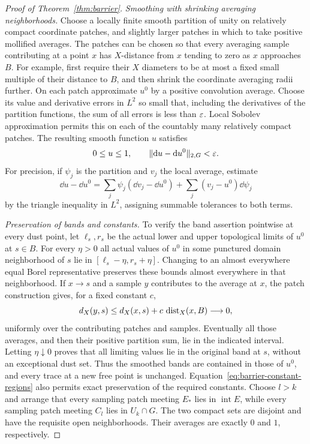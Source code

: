 \begin{proof}[Proof of Theorem~\ref{thm:barrier}]
\emph{Smoothing with shrinking averaging neighborhoods.}
Choose a locally finite smooth partition of unity on relatively compact
coordinate patches, and slightly larger patches in which to take
positive mollified averages.  The patches
can be chosen so that every averaging sample contributing at a
point $x$ has $X$-distance from $x$ tending to zero as $x$ approaches
$B$.  For example, first require their $X$ diameters to be at most
a fixed small multiple of their distance to $B$, and then shrink
the coordinate averaging radii further.  On each patch approximate
$u^0$ by a positive convolution average.  Choose its value and
derivative errors in $L^2$ so small that, including the derivatives
of the partition functions, the sum of all errors is less than
$\varepsilon$.  Local Sobolev approximation permits this on each of the
countably many relatively compact patches.  The resulting smooth
function $u$ satisfies
\[
 0\le u\le1,
 \qquad \|\mathrm d u-\mathrm d u^0\|_{2,G}<\varepsilon.
\]
For precision, if $\psi_j$ is the partition and $v_j$ the local
average, estimate
\[
 \dd u-\dd u^0
   =\sum_j\psi_j(\dd v_j-\dd u^0)
       +\sum_j(v_j-u^0)\dd\psi_j
\]
by the triangle inequality in $L^2$, assigning summable tolerances
to both terms.

\emph{Preservation of bands and constants.}
To verify the band assertion pointwise at every dust point, let
$\ell_s,r_s$ be the actual lower and upper topological limits of
$u^0$ at $s\in B$.  For every $\eta>0$ all actual values of $u^0$
in some punctured domain neighborhood of $s$ lie in
$[\ell_s-\eta,r_s+\eta]$.  Changing to an almost everywhere equal
Borel representative preserves these bounds almost everywhere in
that neighborhood.  If $x\to s$ and a sample $y$ contributes to
the average at $x$, the patch construction gives, for a fixed
constant $c$,
\[
 d_X(y,s)\le d_X(x,s)+c\,\operatorname{dist}_X(x,B)\longrightarrow0,
\]
uniformly over the contributing patches and samples.  Eventually
all those averages, and then their positive partition sum, lie in
the indicated interval.  Letting $\eta\downarrow0$ proves that
all limiting values lie in the original band at $s$, without an
exceptional dust set.
Thus the smoothed bands are contained in those of $u^0$, and every
trace at a new free point is unchanged.  Equation~\eqref{eq:barrier-constant-regions}
also permits exact preservation of the required constants.  Choose
$l>k$ and arrange that every sampling patch meeting $E_*$ lies in
$\operatorname{int}E$, while every sampling patch meeting $C_l$
lies in $U_k\cap G$.  The two compact sets are disjoint and have
the requisite open neighborhoods.  Their averages are exactly $0$
and $1$, respectively.


\end{proof}
